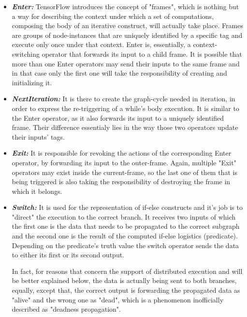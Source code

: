\documentclass[ack,preface]{dithesis}
\begin{document}
    \begin{itemize}

    \item \textit{\textbf{Enter:}} TensorFlow introduces the concept of "frames", which is nothing but a way for describing the context under which a set of computations, composing the body of an iterative construct, will actually take place. Frames are groups of node-instances that are uniquely identified by a specific tag and execute only once under that context. Enter is, essentially, a context-switching operator that forwards its input to a child frame. It is possible that more than one Enter operators may send their inputs to the same frame and in that case only the first one will take the responsibility of creating and initializing it.

    \item \textit{\textbf{NextIteration:}} It is there to create the graph-cycle needed in iteration, in order to express the re-triggering of a while's body execution. It is similar to the Enter operator, as it also forwards its input to a uniquely identified frame. Their difference essentialy lies in the way those two operators update their inputs' tags.

    \item \textit{\textbf{Exit:}} It  is responsible for revoking the actions of the corresponding Enter operator, by forwarding its input to the outer-frame.
 Again, multiple "Exit" operators may exist inside the current-frame, so the last one of them that is being triggered is also taking the responsibility of destroying the frame in which it belongs.

    \item \textit{\textbf{Switch:}} It is used for the representation of if-else constructs and it's job is to "direct" the execution to the correct branch. It receives two inputs of which the first one is the data that needs to be propagated to the correct subgraph and the second one is the result of the computed if-else logistics  (predicate). Depending on the predicate's truth value the switch operator sends the data to either its first or its second output. 

In fact, for reasons that concern the support of distributed execution and will be better explained below,  the data is actually being sent to both branches, equally, 
except that, the correct output is forwarding the propagated data as "alive" and the wrong one as "dead", which is a phenomenon inofficially described as "deadness propagation".


\end{itemize}
\end{document}
